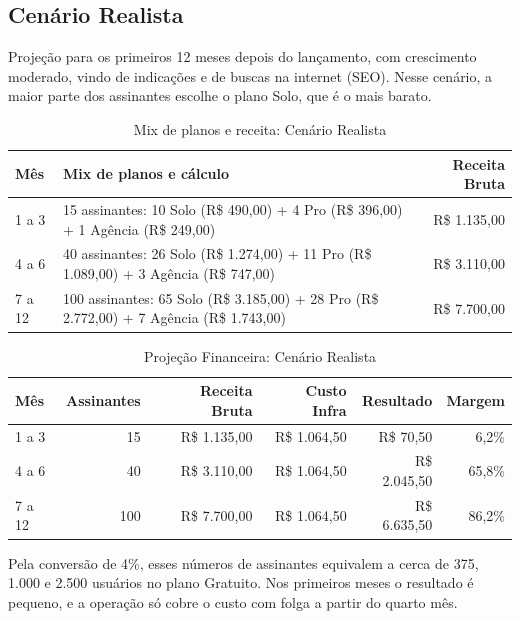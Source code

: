 \subsection{Cenário Realista}

Projeção para os primeiros 12 meses depois do lançamento, com crescimento moderado, vindo de indicações e de buscas na internet (SEO). Nesse cenário, a maior parte dos assinantes escolhe o plano Solo, que é o mais barato.

\begin{table}[H]
\centering
\small
\caption{Mix de planos e receita: Cenário Realista}
\label{tab:mix-realista}
\begin{tabular}{|l|p{6.2cm}|r|}
\hline
\textbf{Mês} & \textbf{Mix de planos e cálculo} & \textbf{Receita Bruta} \\
\hline
1 a 3 & 15 assinantes: 10 Solo (R\$ 490,00) + 4 Pro (R\$ 396,00) + 1 Agência (R\$ 249,00) & R\$ 1.135,00 \\
\hline
4 a 6 & 40 assinantes: 26 Solo (R\$ 1.274,00) + 11 Pro (R\$ 1.089,00) + 3 Agência (R\$ 747,00) & R\$ 3.110,00 \\
\hline
7 a 12 & 100 assinantes: 65 Solo (R\$ 3.185,00) + 28 Pro (R\$ 2.772,00) + 7 Agência (R\$ 1.743,00) & R\$ 7.700,00 \\
\hline
\end{tabular}
\end{table}

\begin{table}[H]
\centering
\small
\caption{Projeção Financeira: Cenário Realista}
\label{tab:realista}
\begin{tabular}{|l|r|r|r|r|r|}
\hline
\textbf{Mês} & \textbf{Assinantes} & \textbf{Receita Bruta} & \textbf{Custo Infra} & \textbf{Resultado} & \textbf{Margem} \\
\hline
1 a 3  & 15  & R\$ 1.135,00 & R\$ 1.064,50 & R\$ 70,50    & 6,2\% \\
\hline
4 a 6  & 40  & R\$ 3.110,00 & R\$ 1.064,50 & R\$ 2.045,50 & 65,8\% \\
\hline
7 a 12 & 100 & R\$ 7.700,00 & R\$ 1.064,50 & R\$ 6.635,50 & 86,2\% \\
\hline
\end{tabular}
\end{table}

Pela conversão de 4\%, esses números de assinantes equivalem a cerca de 375, 1.000 e 2.500 usuários no plano Gratuito. Nos primeiros meses o resultado é pequeno, e a operação só cobre o custo com folga a partir do quarto mês.

